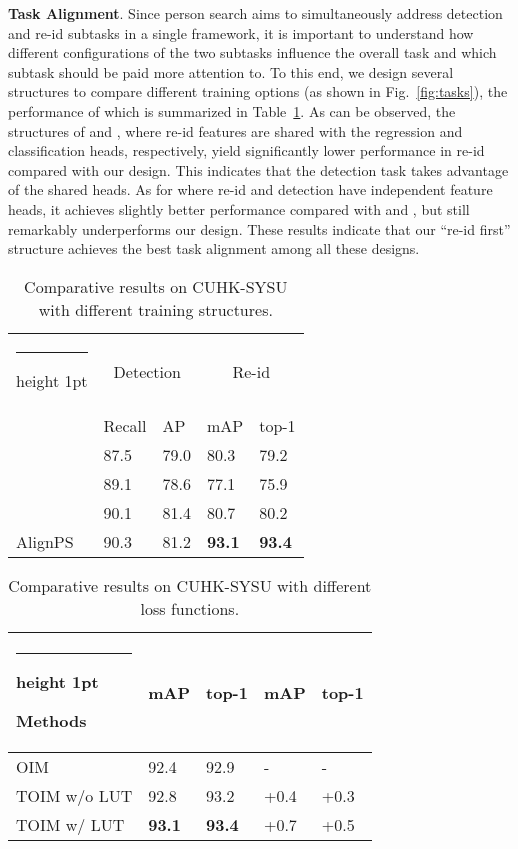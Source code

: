 \documentclass[final]{cvpr}
\makeatletter
\newcommand{\thickhline}{\noalign {\ifnum 0=`}\fi \hrule height 1pt
    \futurelet \reserved@a \@xhline
}
\makeatother
\begin{document}
\textbf{Task Alignment}.
Since person search aims to simultaneously address detection and re-id subtasks in a single framework, it is important to understand how different configurations of the two subtasks influence the overall task and which subtask should be paid more attention to. To this end, we design several structures to compare different training options (as shown in Fig.~\ref{fig:tasks}), the performance of which is summarized in Table~\ref{tab:tasks}. As can be observed, the structures of  and , where re-id features are shared with the regression and classification heads, respectively, yield significantly lower performance in re-id compared with our design. This indicates that the detection task takes advantage of the shared heads. As for  where re-id and detection have independent feature heads, it achieves slightly better performance compared with  and , but still remarkably underperforms our design. 
These results indicate that our ``re-id first'' structure achieves the best task alignment among all these designs.

\begin{table}[t]
\setlength{\abovecaptionskip}{1mm}
\centering
\begin{tabular}{p{1.8cm}|p{1.1cm}<{\centering}p{1.1cm}<{\centering}|p{1.1cm}<{\centering}p{1.1cm}<{\centering}}
\hline\thickhline
\rowcolor{mygray} 
  & \multicolumn{2}{c|}{Detection} & \multicolumn{2}{c}{Re-id}   \\ \cline{2-5} 
\rowcolor{mygray} 
\multirow{-2}{*}{Methods}  & Recall & AP  & mAP  & top-1  \\  \hline \hline     

   & 87.5   & 79.0       & 80.3   & 79.2   \\
  & 89.1   & 78.6      & 77.1   & 75.9    \\ 
  & 90.1   & 81.4       & 80.7   & 80.2  \\
AlignPS  & 90.3    & 81.2 &\textbf{93.1} & \textbf{93.4}\\\hline
\end{tabular}
\caption{Comparative results on CUHK-SYSU with different training structures. }
\label{tab:tasks}
\end{table}

\begin{table}[t]
\setlength{\abovecaptionskip}{1mm}
\centering
\begin{tabular}{p{2.4cm}|p{0.8cm}<{\centering}p{0.8cm}<{\centering}|p{1.1cm}<{\centering}p{1.2cm}<{\centering}}
\hline\thickhline
\rowcolor{mygray} 
{Methods}  & mAP & top-1  &  mAP  &  top-1  \\  \hline \hline     
OIM
   & 92.4   & 92.9       & -   & -  \\
TOIM w/o LUT  & 92.8   & 93.2       & +0.4   & +0.3   \\ 
TOIM  w/ LUT  &\textbf{93.1} & \textbf{93.4} & +0.7    & +0.5\\\hline
\end{tabular}
\caption{Comparative results on CUHK-SYSU with different loss functions. }
\label{tab:toim}
\end{table}
\end{document}
